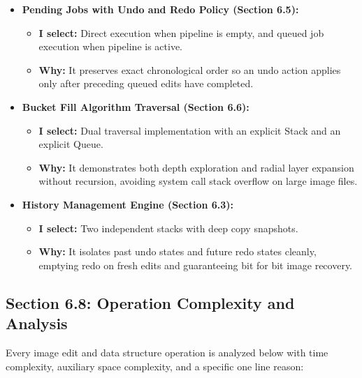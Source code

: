 \documentclass[10pt,a4paper]{article}
\begin{document}
\begin{itemize}[noitemsep,topsep=2pt,parsep=1pt,partopsep=0pt]
    \item \textbf{Pending Jobs with Undo and Redo Policy (Section 6.5):}
    \begin{itemize}[noitemsep,topsep=1pt,parsep=0pt]
        \item \textbf{I select:} Direct execution when pipeline is empty, and queued job execution when pipeline is active.
        \item \textbf{Why:} It preserves exact chronological order so an undo action applies only after preceding queued edits have completed.
    \end{itemize}

    \item \textbf{Bucket Fill Algorithm Traversal (Section 6.6):}
    \begin{itemize}[noitemsep,topsep=1pt,parsep=0pt]
        \item \textbf{I select:} Dual traversal implementation with an explicit Stack and an explicit Queue.
        \item \textbf{Why:} It demonstrates both depth exploration and radial layer expansion without recursion, avoiding system call stack overflow on large image files.
    \end{itemize}

    \item \textbf{History Management Engine (Section 6.3):}
    \begin{itemize}[noitemsep,topsep=1pt,parsep=0pt]
        \item \textbf{I select:} Two independent stacks with deep copy snapshots.
        \item \textbf{Why:} It isolates past undo states and future redo states cleanly, emptying redo on fresh edits and guaranteeing bit for bit image recovery.
    \end{itemize}
\end{itemize}

\clearpage


\subsection*{Section 6.8: Operation Complexity and Analysis}
Every image edit and data structure operation is analyzed below with time complexity, auxiliary space complexity, and a specific one line reason:
\end{document}
